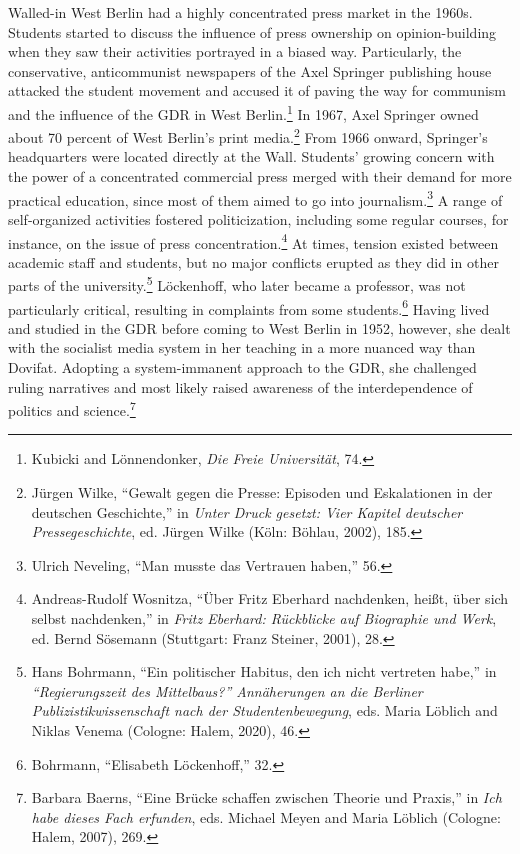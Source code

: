 \documentclass{tufte-handout}
\begin{document}
Walled-in West Berlin had a highly concentrated press market in the
1960s. Students started to discuss the influence of press ownership on
opinion-building when they saw their activities portrayed in a biased
way. Particularly, the conservative, anticommunist newspapers of the
Axel Springer publishing house attacked the student movement and accused
it of paving the way for communism and the influence of the GDR in West
Berlin.\footnote{Kubicki and Lönnendonker, \emph{Die Freie Universität},
  74.} In 1967, Axel Springer owned about 70 percent of West Berlin's
print media.\footnote{Jürgen Wilke, ``Gewalt gegen die Presse: Episoden
  und Eskalationen in der deutschen Geschichte,'' in \emph{Unter Druck
  gesetzt: Vier Kapitel deutscher Pressegeschichte}, ed. Jürgen Wilke
  (Köln: Böhlau, 2002), 185.} From 1966 onward, Springer's headquarters
were located directly at the Wall. Students' growing concern with the
power of a concentrated commercial press merged with their demand for
more practical education, since most of them aimed to go into
journalism.\footnote{Ulrich Neveling, ``Man musste das Vertrauen
  haben,'' 56.} A range of self-organized activities fostered
politicization, including some regular courses, for instance, on the
issue of press concentration.\footnote{Andreas-Rudolf Wosnitza, ``Über
  Fritz Eberhard nachdenken, heißt, über sich selbst nachdenken,'' in
  \emph{Fritz Eberhard: Rückblicke auf Biographie und Werk}, ed. Bernd
  Sösemann (Stuttgart: Franz Steiner, 2001), 28.} At times, tension
existed between academic staff and students, but no major conflicts
erupted as they did in other parts of the university.\footnote{Hans
  Bohrmann, ``Ein politischer Habitus, den ich nicht vertreten habe,''
  in \emph{``Regierungszeit des Mittelbaus?'' Annäherungen an die
  Berliner Publizistikwissenschaft nach der Studentenbewegung}, eds.
  Maria Löblich and Niklas Venema (Cologne: Halem, 2020), 46.}
Löckenhoff, who later became a professor, was not particularly critical,
resulting in complaints from some students.\footnote{Bohrmann,
  ``Elisabeth Löckenhoff,'' 32.} Having lived and studied in the GDR
before coming to West Berlin in 1952, however, she dealt with the
socialist media system in her teaching in a more nuanced way than
Dovifat. Adopting a system-immanent approach to the GDR, she challenged
ruling narratives and most likely raised awareness of the
interdependence of politics and science.\footnote{Barbara Baerns, ``Eine
  Brücke schaffen zwischen Theorie und Praxis,'' in \emph{Ich habe
  dieses Fach erfunden}, eds. Michael Meyen and Maria Löblich (Cologne:
  Halem, 2007), 269.}
\end{document}
